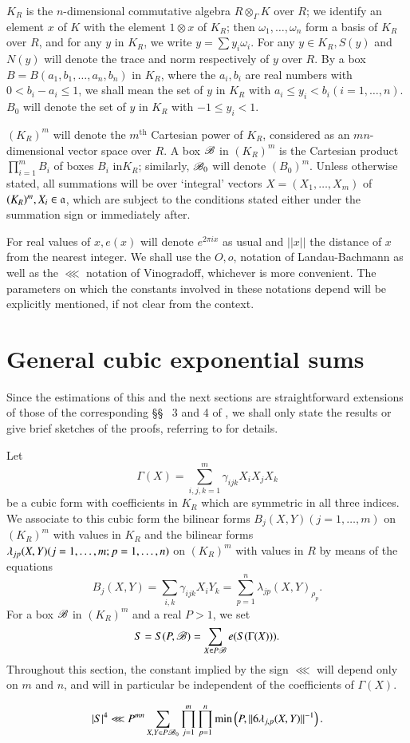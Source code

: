 $K_R$ is the $n$-dimensional commutative algebra $R\otimes_\Gamma K$ 
over $R$; we identify an element $x$ of $K$ with the element $1\otimes 
x$ of $K_R$; then $\omega_1,\ldots,\omega_n$ form a basis of $K_R$ 
over $R$, and for any $y$ in $K_R$, we write $y=\sum y_i\omega_i$. For 
any $y\in K_R, S(y)$ and $N(y)$ will denote the trace and norm 
respectively of $y$ over $R$. By a box $B=B(a_1,b_1,\ldots,a_n,b_n)$ 
in $K_R$, where the $a_i,b_i$ are real numbers with $0<b_i-a_i\leq 1$, 
we shall mean the set of $y$ in $K_R$ with $a_i\leq 
y_i<b_i(i=1,\ldots, n)$. $B_0$ will denote the set of $y$ in $K_R$ 
with $-1\leq y_i<1$.

$(K_R)^m$ will denote the $m^{\text{th}}$ Cartesian power of $K_R$, considered 
as an $mn$-dimensional vector space over $R$. A box $\mathscr{B}$ in $(K_R)^m$ 
is the Cartesian product $\prod\limits_{i=1}^m B_i$ of boxes $B_i$ 
in\pageoriginale $K_R$; similarly, $\mathscr{B}_0$ will denote $(B_0)^m$. 
Unless otherwise stated, all summations will be over `integral' 
vectors $X=(X_1,\ldots,X_m)$ of $(K_R)^m, X_i\in\mathfrak{a}$, which are 
subject to the conditions stated either under the summation sign or 
immediately after.

For real values of $x, e(x)$ will denote $e^{2\pi ix}$ as usual and 
$||x||$ the distance of $x$ from the nearest integer. We shall use the 
$O,o$, notation of Landau-Bachmann as well as the $\lll$ notation of 
Vinogradoff, whichever is more convenient. The parameters on which the 
constants involved in these notations depend will be explicitly 
mentioned, if not clear from the context.

\section{General cubic exponential sums}\label{sec1}
Since the estimations of this and the next sections are 
straightforward extensions of those of the corresponding \S\S~ 
3 and 4 of \cite{key3}, we shall only state the results or 
give brief sketches of the proofs, referring to \cite{key3} for details. 

Let
$$
\Gamma(X)=\sum\limits_{i,j,k=1}^m\gamma_{ijk}X_iX_jX_k
$$
be a cubic form with coefficients in $K_R$ which are symmetric in all 
three indices. We associate to this cubic form the bilinear forms 
$B_j(X,Y)(j=1,\ldots,m)$ on $(K_R)^m$ with values in $K_R$ and the 
bilinear forms $\lambda_{jp}(X,Y)\break (j=1,\ldots,m;p=1,\ldots,n)$ on 
$(K_R)^m$ with values in $R$ by means of the equations 
$$
B_j(X,Y)=\sum\limits_{i,k}\gamma_{ijk}X_iY_k=\sum\limits_{p=1}^n 
\lambda_{jp}(X,Y)_{\rho_p}.
$$
For a box $\mathscr{B}$ in $(K_R)^m$ and a real $P>1$, we set 
$$
S=S(P,\mathscr{B})=\sum\limits_{X\in P\mathscr{B}}e(S(\Gamma(X))).
$$
Throughout this section, the constant implied by the sign $\lll$ will 
depend only on $m$ and $n$, and will in particular be independent of 
the coefficients of $\Gamma(X)$.
\begin{lemma}\label{lem1.1}
$$
|S|^4\lll P^{mn}\sum\limits_{X,Y\in P\mathscr{B}_0}\prod_{j=1}^m 
\prod\limits_{p=1}^n\min \left({P,||6\lambda_{j,p}(X,Y)||^{-1}}\right).
$$
\end{lemma}

